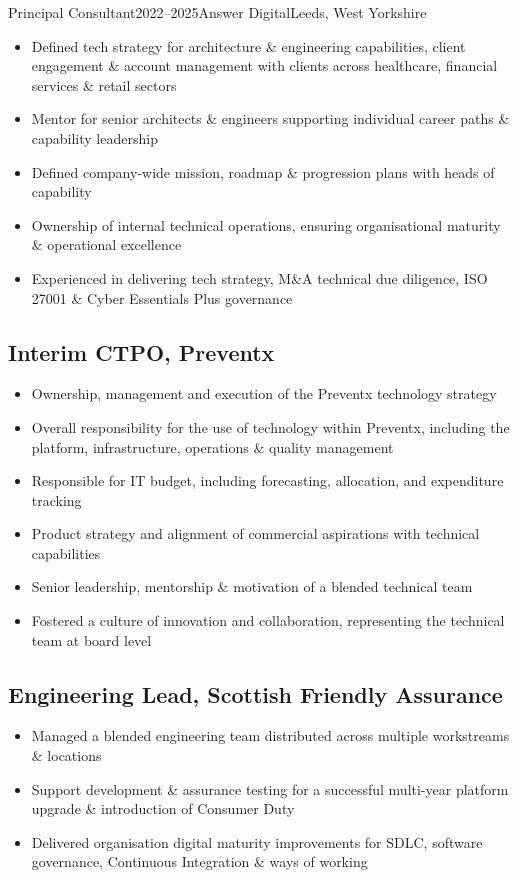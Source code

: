 \documentclass{cv}
\begin{document}
\begin{experienceplain}{Principal Consultant}{2022--2025}{Answer Digital}{Leeds, West Yorkshire}
\begin{itemize}
\item Defined tech strategy for architecture \& engineering capabilities, client engagement \&
      account management with clients across healthcare, financial services \& retail sectors
\item Mentor for senior architects \& engineers supporting individual career paths \& capability leadership
\item Defined company-wide mission, roadmap \& progression plans with heads of capability
\item Ownership of internal technical operations, ensuring organisational maturity \& operational excellence
\item Experienced in delivering tech strategy, M\&A technical due diligence, ISO 27001 \& Cyber Essentials Plus governance
\end{itemize}

\subsection{Interim CTPO, Preventx}
\begin{itemize}
\item Ownership, management and execution of the Preventx technology strategy
\item Overall responsibility for the use of technology within Preventx, including the platform,
      infrastructure, operations \& quality management
\item Responsible for IT budget, including forecasting, allocation, and expenditure tracking
\item Product strategy and alignment of commercial aspirations with technical capabilities
\item Senior leadership, mentorship \& motivation of a blended technical team
\item Fostered a culture of innovation and collaboration, representing the technical team at board level
\end{itemize}

\subsection{Engineering Lead, Scottish Friendly Assurance}
\begin{itemize}
\item Managed a blended engineering team distributed across multiple workstreams \& locations
\item Support development \& assurance testing for a successful multi-year platform upgrade \&
      introduction of Consumer Duty
\item Delivered organisation digital maturity improvements for SDLC, software governance,
      Continuous Integration \& ways of working
\end{itemize}


\end{experienceplain}
\end{document}
